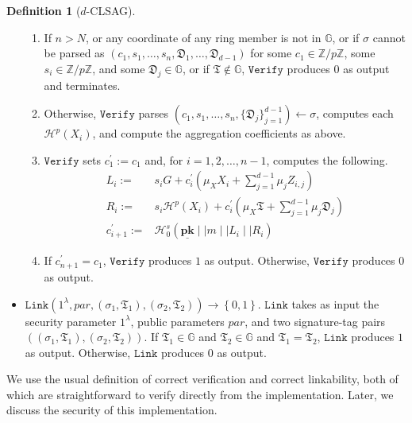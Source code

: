 \documentclass{mrl}
\theoremstyle{plain}
\theoremstyle{definition}
\newtheorem{defn}{Definition}[section]
\begin{document}
\begin{defn}[$d$-CLSAG]
\begin{itemize}
\begin{enumerate}
\item If $n > N$, or any coordinate of any ring member is not in $\mathbb{G}$, or if $\sigma$ cannot be parsed as $(c_1, s_1, \ldots, s_n, \mathfrak{D}_1, \ldots, \mathfrak{D}_{d-1})$ for some $c_1 \in \mathbb{Z}/p\mathbb{Z}$, some $s_i \in \mathbb{Z}/p\mathbb{Z}$, and some $\mathfrak{D}_j \in \mathbb{G}$, or if $\mathfrak{T} \notin \mathbb{G}$, $\texttt{Verify}$ produces $0$ as output and terminates.

\item Otherwise, $\texttt{Verify}$ parses $(c_1, s_1, \ldots, s_n, \{\mathfrak{D}_j\}_{j=1}^{d-1}) \leftarrow \sigma$, computes each $\mathcal{H}^p(X_i)$, and compute the aggregation coefficients as above.

\item $\texttt{Verify}$ sets $c_1^\prime := c_1$ and, for $i=1, 2, \ldots, n-1$, computes the following.
\begin{align*}
L_i :=& s_i G + c_i^\prime \left(\mu_X X_i + \sum_{j=1}^{d-1} \mu_jZ_{i,j}\right) \\ 
R_i :=& s_i \mathcal{H}^p(X_i) + c_i^\prime\left(\mu_X \mathfrak{T} + \sum_{j=1}^{d-1} \mu_j \mathfrak{D}_j\right)\\
c_{i+1}^\prime :=& \mathcal{H}^s_0\left(\underline{\textbf{pk}} \mid \mid m \mid \mid L_i \mid \mid R_i\right)
\end{align*}
\item If $c_{n+1}^\prime = c_1$, $\texttt{Verify}$ produces $1$ as output. Otherwise, $\texttt{Verify}$ produces $0$ as output.
\end{enumerate}

\item $\texttt{Link}\left(1^\lambda, \textit{par}, (\sigma_1, \mathfrak{T}_1), (\sigma_2, \mathfrak{T}_2)\right) \to \left\{0,1\right\}$. $\texttt{Link}$ takes as input the security parameter $1^\lambda$, public parameters $\textit{par}$, and two signature-tag pairs $((\sigma_1, \mathfrak{T}_1), (\sigma_2, \mathfrak{T}_2))$. If $\mathfrak{T}_1 \in \mathbb{G}$ and $\mathfrak{T}_2 \in \mathbb{G}$ and $\mathfrak{T}_1 = \mathfrak{T}_2$, $\texttt{Link}$ produces $1$ as output. Otherwise, $\texttt{Link}$ produces $0$ as output.
\end{itemize}

\end{defn}

We use the usual definition of correct verification and correct linkability, both of which are straightforward to verify directly from the implementation. Later, we discuss the security of this implementation. 
\end{document}

